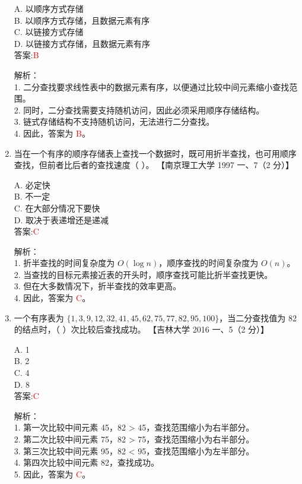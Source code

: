 \documentclass[lang=cn,newtx,10pt,scheme=chinese]{../../../elegantbook}
\begin{document}
\begin{enumerate}
    A. 以顺序方式存储 \\  
    B. 以顺序方式存储，且数据元素有序 \\  
    C. 以链接方式存储 \\  
    D. 以链接方式存储，且数据元素有序 \\  

    答案:\textcolor{red}{B}

    解析：\\
    1. 二分查找要求线性表中的数据元素有序，以便通过比较中间元素缩小查找范围。\\
    2. 同时，二分查找需要支持随机访问，因此必须采用顺序存储结构。\\
    3. 链式存储结构不支持随机访问，无法进行二分查找。\\
    4. 因此，答案为 \textcolor{red}{B}。\\

\item 当在一个有序的顺序存储表上查找一个数据时，既可用折半查找，也可用顺序查找，但前者比后者的查找速度（ ）。  
    【南京理工大学 1997 一、7（2 分）】  

    A. 必定快 \\  
    B. 不一定 \\  
    C. 在大部分情况下要快 \\  
    D. 取决于表递增还是递减 \\  

    答案:\textcolor{red}{C}

    解析：\\
    1. 折半查找的时间复杂度为 $O(\log n)$，顺序查找的时间复杂度为 $O(n)$。\\
    2. 当查找的目标元素接近表的开头时，顺序查找可能比折半查找更快。\\
    3. 但在大多数情况下，折半查找的效率更高。\\
    4. 因此，答案为 \textcolor{red}{C}。\\

\item 一个有序表为 $\{1, 3, 9, 12, 32, 41, 45, 62, 75, 77, 82, 95, 100\}$，当二分查找值为 82 的结点时，（ ）次比较后查找成功。  
    【吉林大学 2016 一、5（2 分）】  

    A. 1 \\  
    B. 2 \\  
    C. 4 \\  
    D. 8 \\  

    答案:\textcolor{red}{C}

    解析：\\
    1. 第一次比较中间元素 45，82 > 45，查找范围缩小为右半部分。\\
    2. 第二次比较中间元素 75，82 > 75，查找范围缩小为右半部分。\\
    3. 第三次比较中间元素 95，82 < 95，查找范围缩小为左半部分。\\
    4. 第四次比较中间元素 82，查找成功。\\
    5. 因此，答案为 \textcolor{red}{C}。\\


\end{enumerate}
\end{document}
